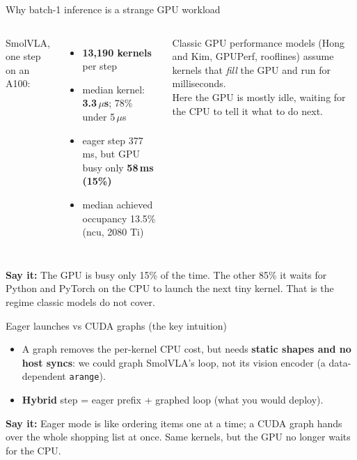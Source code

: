 \documentclass[aspectratio=169,10pt]{beamer}
\newcommand{\say}[1]{\par\vfill\noindent\colorbox{soft}{\parbox{\dimexpr\textwidth-2\fboxsep\relax}{\small\textbf{\textcolor{accent}{Say it:}} #1}}}
\begin{document}
\begin{frame}{Why batch-1 inference is a strange GPU workload}
\begin{columns}[T]
SmolVLA, one step on an A100:
\begin{itemize}
\item \textbf{13,190 kernels} per step
\item median kernel: \textbf{3.3\,$\mu$s}; 78\% under 5\,$\mu$s
\item eager step 377\,ms, but GPU busy only \textbf{58\,ms (15\%)}
\item median achieved occupancy 13.5\% (ncu, 2080 Ti)
\end{itemize}
Classic GPU performance models (Hong and Kim, GPUPerf, rooflines) assume kernels that
\emph{fill} the GPU and run for milliseconds.\\[0.6em]
Here the GPU is mostly \alert{idle, waiting for the CPU} to tell it what to do next.
\end{columns}
\say{The GPU is busy only 15\% of the time. The other 85\% it waits for Python and PyTorch on
the CPU to launch the next tiny kernel. That is the regime classic models do not cover.}
\end{frame}

\begin{frame}{Eager launches vs CUDA graphs (the key intuition)}
\begin{itemize}
\item A graph removes the per-kernel CPU cost, but needs \textbf{static shapes and no host
  syncs}: we could graph SmolVLA's loop, not its vision encoder (a data-dependent
  \texttt{arange}).
\item \textbf{Hybrid} step = eager prefix + graphed loop (what you would deploy).
\end{itemize}
\say{Eager mode is like ordering items one at a time; a CUDA graph hands over the whole
shopping list at once. Same kernels, but the GPU no longer waits for the CPU.}
\end{frame}
\end{document}
